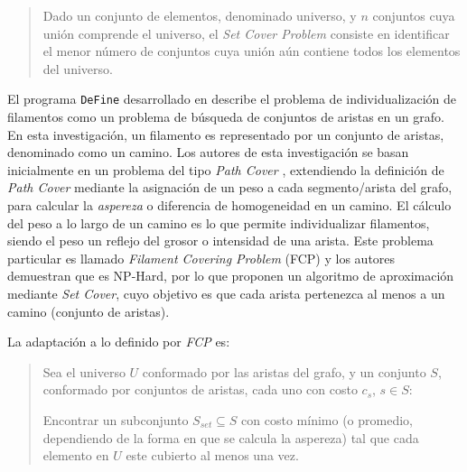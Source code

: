 \begin{quote}
Dado un conjunto de elementos, denominado universo, y $n$ conjuntos cuya unión comprende el universo, el {\it Set Cover Problem} consiste en identificar el menor n\'umero de conjuntos cuya unión a\'un contiene todos los elementos del universo.
\end{quote}


\medskip

El programa \texttt{DeFine} desarrollado en \citet{breuer2015define} describe el problema de individualizaci\'on de filamentos como un problema de b\'usqueda de conjuntos de aristas en un grafo. En esta investigaci\'on, un filamento es representado por un conjunto de aristas, denominado como un camino. Los autores de esta investigaci\'on se basan inicialmente en un problema del tipo {\it Path Cover} \citep{ntafos1979path}, extendiendo la definici\'on de {\it Path Cover} mediante la asignaci\'on de un peso a cada segmento/arista del grafo, para calcular la {\it aspereza} o diferencia de homogeneidad en un camino. El c\'alculo del peso a lo largo de un camino es lo que permite individualizar filamentos, siendo el peso un reflejo del grosor o intensidad de una arista.
Este problema particular es llamado {\it Filament Covering Problem} (FCP) y los autores demuestran que es NP-Hard, por lo que proponen un algoritmo de aproximaci\'on mediante {\it Set Cover}, cuyo objetivo es que cada arista pertenezca al menos a un camino (conjunto de aristas).

La adaptaci\'on a lo definido por {\it FCP} es: 
\begin{quote}
Sea el universo $U$ conformado por las aristas del grafo, y un conjunto $S$, conformado por conjuntos de aristas, cada uno con costo $c_s$, $s \in S$:

Encontrar un subconjunto $S_{set} \subseteq S$ con costo m\'inimo (o promedio, dependiendo de la forma en que se calcula la aspereza) tal que cada elemento en $U$ este cubierto al menos una vez.
\end{quote}

